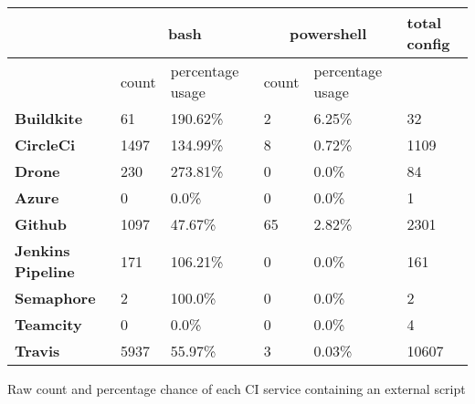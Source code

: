 

\begin{tabular}{|l|l|l|l|l|l|}
\hline
{} &  \multicolumn{2}{c|}{\textbf{bash}} &  \multicolumn{2}{c|}{\textbf{powershell}} & \textbf{total config}\\ \hline
{}                       & count &  percentage usage &  count &  percentage usage & \\ \hline

    
    \textbf{Buildkite      } &    61 &    190.62\% &   2  &  6.25\% &    32    \\ \hline
    \textbf{CircleCi       } &  1497 &    134.99\% &   8  &  0.72\% &  1109    \\ \hline
    \textbf{Drone          } &   230 &    273.81\% &   0  &   0.0\% &    84    \\ \hline
    \textbf{Azure          } &     0 &       0.0\% &   0  &   0.0\% &     1    \\ \hline
    \textbf{Github         } &  1097 &     47.67\% &  65  &  2.82\% &  2301    \\ \hline
    \textbf{Jenkins Pipeline} &   171 &    106.21\% &   0  &   0.0\% &    161   \\ \hline
    \textbf{Semaphore      } &     2 &     100.0\% &   0  &   0.0\% &     2    \\ \hline
    \textbf{Teamcity       } &     0 &       0.0\% &   0  &   0.0\% &     4    \\ \hline
    \textbf{Travis         } &  5937 &     55.97\% &   3  &  0.03\% & 10607   \\ \hline

\end{tabular}
\caption{Raw count and percentage chance of each CI service containing an external script}
\label{table:scripts used}